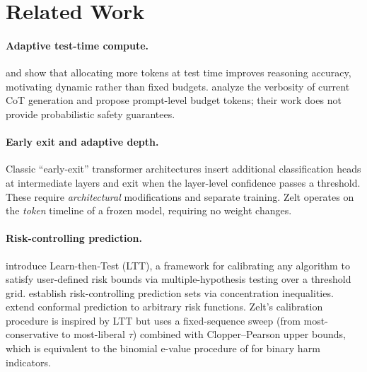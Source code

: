 \documentclass[11pt]{article}
\begin{document}
\section{Related Work}
\label{sec:related}

\paragraph{Adaptive test-time compute.}
\citet{snell2024scalingllmtesttime} and \citet{openai2024o1} show that
allocating more tokens at test time improves reasoning accuracy, motivating
dynamic rather than fixed budgets.  \citet{han2024tokenbudget} analyze
the verbosity of current CoT generation and propose prompt-level budget
tokens; their work does not provide probabilistic safety guarantees.

\paragraph{Early exit and adaptive depth.}
Classic ``early-exit'' transformer architectures \citep{teerapittayanon2016branchynet,
zhou2020bert} insert additional classification heads at intermediate layers
and exit when the layer-level confidence passes a threshold.
These require \emph{architectural} modifications and separate training.
Zelt operates on the \emph{token} timeline of a frozen model, requiring
no weight changes.

\paragraph{Risk-controlling prediction.}
\citet{angelopoulos2021learntest} introduce Learn-then-Test (LTT), a
framework for calibrating any algorithm to satisfy user-defined risk bounds
via multiple-hypothesis testing over a threshold grid.
\citet{bates2021rcps} establish risk-controlling prediction sets via
concentration inequalities.  \citet{angelopoulos2021conformal} extend
conformal prediction to arbitrary risk functions.
Zelt's calibration procedure is inspired by LTT but uses a fixed-sequence
sweep (from most-conservative to most-liberal $\tau$) combined with
Clopper--Pearson upper bounds, which is equivalent to the binomial
e-value procedure of \citet{angelopoulos2021learntest} for binary harm indicators.
\end{document}
